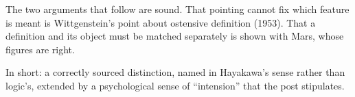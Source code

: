 \begin{afterword}
The two arguments that follow are sound. That pointing cannot fix which feature is meant is Wittgenstein's point about ostensive definition (1953). That a definition and its object must be matched separately is shown with Mars, whose figures are right.

In short: a correctly sourced distinction, named in Hayakawa's sense rather than logic's, extended by a psychological sense of ``intension'' that the post stipulates.
\end{afterword}
